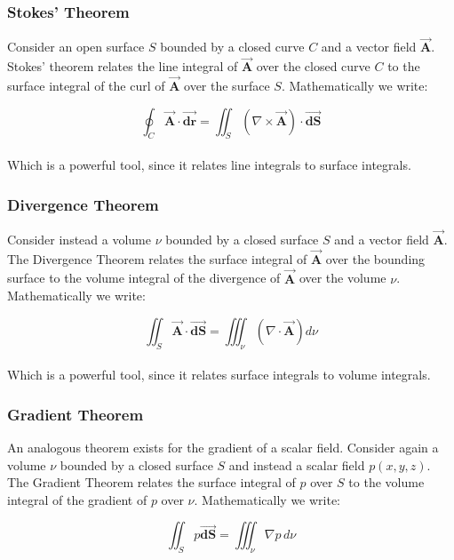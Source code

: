 \documentclass[11pt]{article}
\begin{document}
\subsubsection{Stokes' Theorem}
Consider an open surface $S$ bounded by a closed curve $C$ and a vector field $\vec{\bm{A}}$. Stokes' theorem relates the line integral of $\vec{\bm{A}}$ over the closed curve $C$ to the surface integral of the curl of $\vec{\bm{A}}$ over the surface $S$. Mathematically we write:

\begin{equation}\label{stokesTheorem}
    \oint_C \vec{\bm{A}} \cdot \vec{\bm{dr}} = \iint_S (\nabla \times \vec{\bm{A}}) \cdot \vec{\bm{dS}}
\end{equation}\\
\noindent
Which is a powerful tool, since it relates line integrals to surface integrals.\\

\subsubsection{Divergence Theorem}
Consider instead a volume $\nu$ bounded by a closed surface $S$ and a vector field $\vec{\bm{A}}$. The Divergence Theorem relates the surface integral of $\vec{\bm{A}}$ over the bounding surface to the volume integral of the divergence of $\vec{\bm{A}}$ over the volume $\nu$. Mathematically we write:

\begin{equation}\label{divergenceTheorem}
    \iint_S \vec{\bm{A}} \cdot \vec{\bm{dS}} = \iiint_\nu (\nabla \cdot \vec{\bm{A}}) d\nu
\end{equation}\\
\noindent
Which is a powerful tool, since it relates surface integrals to volume integrals.\\

\subsubsection{Gradient Theorem}
An analogous theorem exists for the gradient of a scalar field. Consider again a volume $\nu$ bounded by a closed surface $S$ and instead a scalar field $p(x,y,z)$. The Gradient Theorem relates the surface integral of $p$ over $S$ to the volume integral of the gradient of $p$ over $\nu$. Mathematically we write:

\begin{equation}\label{gradientTheorem}
    \iint_S p \vec{\bm{dS}} = \iiint_\nu \nabla p\, d\nu
\end{equation}\\
\end{document}
